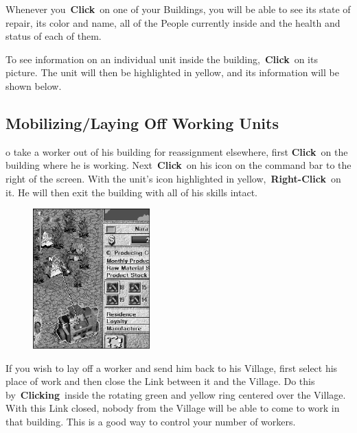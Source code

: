 Whenever you \textbf{Click} on one of your Buildings, you will be able to see its state of repair, its color and name, all of the People currently inside and the health and status of each of them.

To see information on an individual unit inside the building, \textbf{Click} on its picture. The unit will then be highlighted in yellow, and its information will be shown below.

\subsection{Mobilizing/Laying Off Working Units}


o take a worker out of his building for reassignment elsewhere, first \textbf{Click} on the building where he is working. Next \textbf{Click} on his icon on the command bar to the right of the screen. With the unit’s icon highlighted in yellow, \textbf{Right-Click} on it. He will then exit the building with all of his skills intact.

\begin{figure}
	\vspace{-20pt}
	\begin{center}
		\includegraphics[width=0.4\textwidth]{Icloselink}
	\end{center}
	\vspace{-10pt}
\end{figure}

If you wish to lay off a worker and send him back to his Village, first select his place of work and then close the Link between it and the Village. Do this by \textbf{Clicking} inside the rotating green and yellow ring centered over the Village. With this Link closed, nobody from the Village will be able to come to work in that building. This is a good way to control your number of workers.

